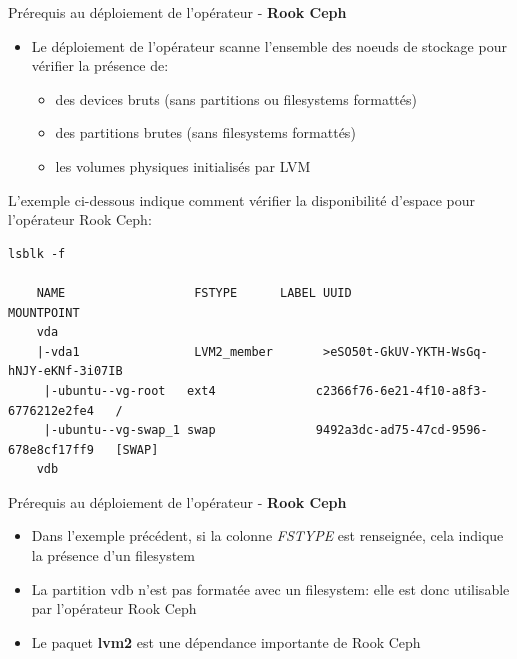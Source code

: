 \begin{frame}[fragile]{Prérequis au déploiement de l'opérateur - \textbf{Rook Ceph}}

\begin{itemize}
   \item Le déploiement de l'opérateur scanne l'ensemble des noeuds de stockage pour vérifier la présence de:
   \begin{itemize}
      \item des devices bruts (sans partitions ou filesystems formattés)
      \item des partitions brutes (sans filesystems formattés)
      \item les volumes physiques initialisés par LVM
   \end{itemize}
\end{itemize}

L'exemple ci-dessous indique comment vérifier la disponibilité d'espace pour l'opérateur Rook Ceph:

\begin{tiny}
\begin{Verbatim}[commandchars=\\\{\}]
lsblk -f

    NAME                  FSTYPE      LABEL UUID                                   MOUNTPOINT
    vda
    |-vda1                LVM2_member       >eSO50t-GkUV-YKTH-WsGq-hNJY-eKNf-3i07IB
     |-ubuntu--vg-root   ext4              c2366f76-6e21-4f10-a8f3-6776212e2fe4   /
     |-ubuntu--vg-swap_1 swap              9492a3dc-ad75-47cd-9596-678e8cf17ff9   [SWAP]
    vdb
\end{Verbatim}
\end{tiny}

\end{frame}


\begin{frame}[fragile]{Prérequis au déploiement de l'opérateur - \textbf{Rook Ceph}}

\begin{itemize}
   \item Dans l'exemple précédent, si la colonne \textit{FSTYPE} est renseignée, cela indique la présence d'un filesystem
   \item La partition vdb n'est pas formatée avec un filesystem: elle est donc utilisable par l'opérateur Rook Ceph
   \item Le paquet \textbf{lvm2} est une dépendance importante de Rook Ceph
\end{itemize}

\end{frame}

